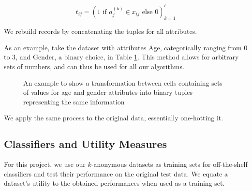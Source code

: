 $$t_{ij} = (1 \mbox{ if } a_j^{(k)} \in x_{ij} \mbox{ else } 0)_{k=1}^l$$

We rebuild records by concatenating the tuples for all attributes.

As an example, take the dataset with attributes Age, categorically ranging from $0$ to $3$, and Gender, a binary choice, in Table \ref{tab:bitmap_example}. This method allows for arbitrary sets of numbers, and can thus be used for all our algorithms.

\begin{figure}
\centering
{}
\caption{An example to show a transformation between cells containing sets of values for age and gender attributes into binary tuples representing the same information}
\label{tab:bitmap_example}
\end{figure}

We apply the same process to the original data, essentially one-hotting it.

\subsection{Classifiers and Utility Measures}
\label{sec:util_measures}
For this project, we use our $k$-anonymous datasets as training sets for off-the-shelf classifiers and test their performance on the original test data. We equate a dataset's utility to the obtained performances when used as a training set.

